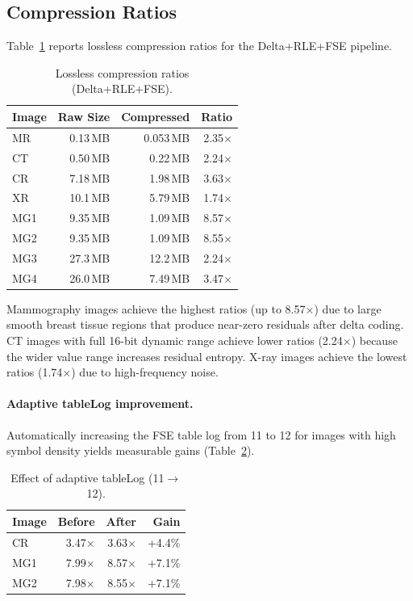 \documentclass[11pt,twocolumn]{article}
\begin{document}
\subsection{Compression Ratios}

Table~\ref{tab:ratios} reports lossless compression ratios for the Delta+RLE+FSE pipeline.

\begin{table}[t]
\centering
\caption{Lossless compression ratios (Delta+RLE+FSE).}
\label{tab:ratios}
\small
\begin{tabular}{@{}lrrr@{}}
\toprule
Image & Raw Size & Compressed & Ratio \\
\midrule
MR   & 0.13\,MB & 0.053\,MB & 2.35$\times$ \\
CT   & 0.50\,MB & 0.22\,MB  & 2.24$\times$ \\
CR   & 7.18\,MB & 1.98\,MB  & 3.63$\times$ \\
XR   & 10.1\,MB & 5.79\,MB  & 1.74$\times$ \\
MG1  & 9.35\,MB & 1.09\,MB  & 8.57$\times$ \\
MG2  & 9.35\,MB & 1.09\,MB  & 8.55$\times$ \\
MG3  & 27.3\,MB & 12.2\,MB  & 2.24$\times$ \\
MG4  & 26.0\,MB & 7.49\,MB  & 3.47$\times$ \\
\bottomrule
\end{tabular}
\end{table}

Mammography images achieve the highest ratios (up to 8.57$\times$) due to large smooth breast tissue regions that produce near-zero residuals after delta coding.
CT images with full 16-bit dynamic range achieve lower ratios (2.24$\times$) because the wider value range increases residual entropy.
X-ray images achieve the lowest ratios (1.74$\times$) due to high-frequency noise.

\paragraph{Adaptive tableLog improvement.}
Automatically increasing the FSE table log from 11 to 12 for images with high symbol density yields measurable gains (Table~\ref{tab:tablelog}).

\begin{table}[t]
\centering
\caption{Effect of adaptive tableLog (11$\to$12).}
\label{tab:tablelog}
\small
\begin{tabular}{@{}lrrr@{}}
\toprule
Image & Before & After & Gain \\
\midrule
CR  & 3.47$\times$ & 3.63$\times$ & +4.4\% \\
MG1 & 7.99$\times$ & 8.57$\times$ & +7.1\% \\
MG2 & 7.98$\times$ & 8.55$\times$ & +7.1\% \\
\bottomrule
\end{tabular}
\end{table}
\end{document}

